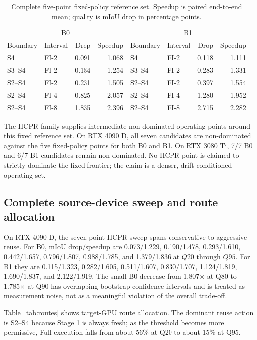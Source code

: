 \documentclass[runningheads]{llncs}
\begin{document}
\begin{table}[t]
\centering
\caption{Complete five-point fixed-policy reference set. Speedup is paired end-to-end mean; quality is mIoU drop in percentage points.}
\label{tab:fixed}
\small
\setlength{\tabcolsep}{3.5pt}
\begin{tabular}{llrr|llrr}
\toprule
\multicolumn{4}{c|}{B0} & \multicolumn{4}{c}{B1} \\
Boundary & Interval & Drop & Speedup & Boundary & Interval & Drop & Speedup \\
\midrule
S4 & FI-2 & 0.091 & 1.068 & S4 & FI-2 & 0.118 & 1.111 \\
S3--S4 & FI-2 & 0.184 & 1.254 & S3--S4 & FI-2 & 0.283 & 1.331 \\
S2--S4 & FI-2 & 0.231 & 1.505 & S2--S4 & FI-2 & 0.397 & 1.554 \\
S2--S4 & FI-4 & 0.825 & 2.057 & S2--S4 & FI-4 & 1.280 & 1.952 \\
S2--S4 & FI-8 & 1.835 & 2.396 & S2--S4 & FI-8 & 2.715 & 2.282 \\
\bottomrule
\end{tabular}
\end{table}

The HCPR family supplies intermediate non-dominated operating points around this fixed reference set. On RTX 4090 D, all seven candidates are non-dominated against the five fixed-policy points for both B0 and B1. On RTX 3080 Ti, 7/7 B0 and 6/7 B1 candidates remain non-dominated. No HCPR point is claimed to strictly dominate the fixed frontier; the claim is a denser, drift-conditioned operating set.

\subsection{Complete source-device sweep and route allocation}
On RTX 4090 D, the seven-point HCPR sweep spans conservative to aggressive reuse. For B0, mIoU drop/speedup are 0.073/1.229, 0.190/1.478, 0.293/1.610, 0.442/1.657, 0.796/1.807, 0.988/1.785, and 1.379/1.836 at $Q20$ through $Q95$. For B1 they are 0.115/1.323, 0.282/1.605, 0.511/1.607, 0.830/1.707, 1.124/1.819, 1.690/1.837, and 2.122/1.919. The small B0 decrease from 1.807$\times$ at Q80 to 1.785$\times$ at Q90 has overlapping bootstrap confidence intervals and is treated as measurement noise, not as a meaningful violation of the overall trade-off.

Table~\ref{tab:routes} shows target-GPU route allocation. The dominant reuse action is S2--S4 because Stage 1 is always fresh; as the threshold becomes more permissive, Full execution falls from about 56\% at Q20 to about 15\% at Q95.
\end{document}

